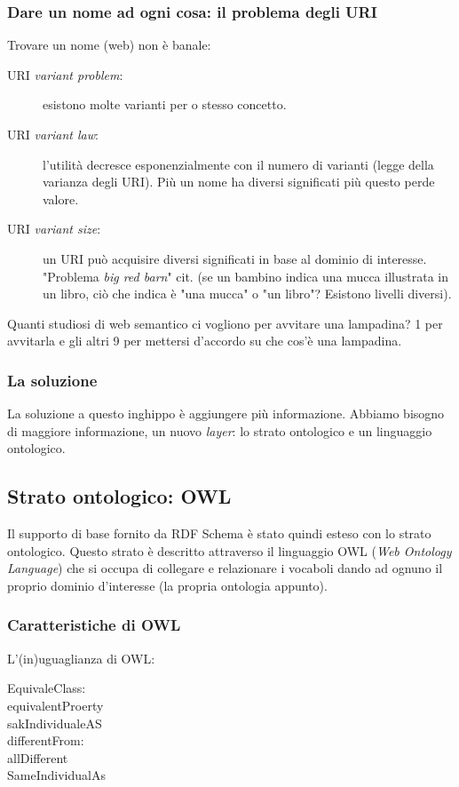 			\subsubsection{Dare un nome ad ogni cosa: il problema degli URI}
				Trovare un nome (web) non è banale:
				\begin{description}
					\item[URI \emph{variant problem}:] esistono molte varianti per o stesso concetto.
					\item[URI \emph{variant law}:] l'utilità decresce esponenzialmente con il numero di varianti (legge della varianza degli URI). Più un nome ha diversi significati più questo perde valore.
					\item[URI \emph{variant size}:] un URI può acquisire diversi significati in base al dominio di interesse. "Problema \emph{big red barn}" cit. (se un bambino indica una mucca illustrata in un libro, ciò che indica è "una mucca" o "un libro"? Esistono livelli diversi).
				\end{description}
				
				Quanti studiosi di web semantico ci vogliono per avvitare una lampadina? 1 per avvitarla e gli altri 9 per mettersi d'accordo su che cos'è una lampadina.
				
			
			\subsubsection{La soluzione}
				La soluzione a questo inghippo è aggiungere più informazione. Abbiamo bisogno di maggiore informazione, un nuovo \emph{layer}: lo strato ontologico e un linguaggio ontologico.
		
		\subsection{Strato ontologico: OWL}
			Il supporto di base fornito da RDF Schema è stato quindi esteso con lo strato ontologico. Questo strato è descritto attraverso il linguaggio OWL (\emph{Web Ontology Language}) che si occupa di collegare e relazionare i vocaboli dando ad ognuno il proprio dominio d'interesse (la propria ontologia appunto).
		
			\subsubsection{Caratteristiche di OWL}
			
				L'(in)uguaglianza di OWL:	
					\begin{description}
						\item[EquivaleClass:]
						\item[equivalentProerty]
						\item[sakIndividualeAS]
						\item[differentFrom:]
						\item[allDifferent]
						\item[SameIndividualAs]
					\end{description}
					
